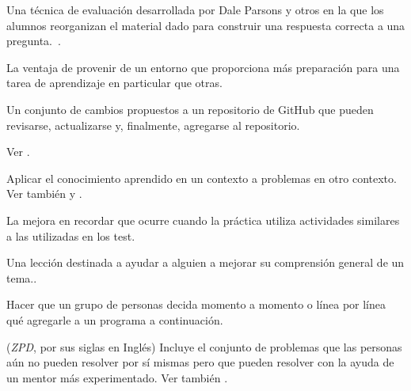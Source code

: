 \begin{description}
 Una técnica de evaluación desarrollada 
por Dale Parsons y otros en la que los alumnos reorganizan el material dado 
para construir una respuesta correcta a una pregunta.~\cite{Pars2006}.
















 La ventaja de provenir de un entorno que proporciona más preparación para una tarea de aprendizaje en particular que otras.



 Un conjunto de cambios propuestos a un repositorio de 
GitHub que pueden revisarse, actualizarse y, finalmente, agregarse al repositorio.



Ver .

























 Aplicar el conocimiento aprendido en un contexto a problemas en otro contexto.  Ver también
 y .

 La mejora en  recordar que ocurre cuando la práctica utiliza actividades similares a las utilizadas en los test.

 Una lección destinada a ayudar a alguien a 
mejorar su comprensión general de un tema..

Hacer que un grupo de personas decida momento a momento 
o línea por línea qué agregarle a un programa a continuación.



 (\emph{ZPD}, por sus siglas en Inglés) Incluye el conjunto de problemas que las personas aún no pueden resolver por sí mismas pero que pueden resolver con la ayuda de un mentor más experimentado.  Ver también .

\end{description}
